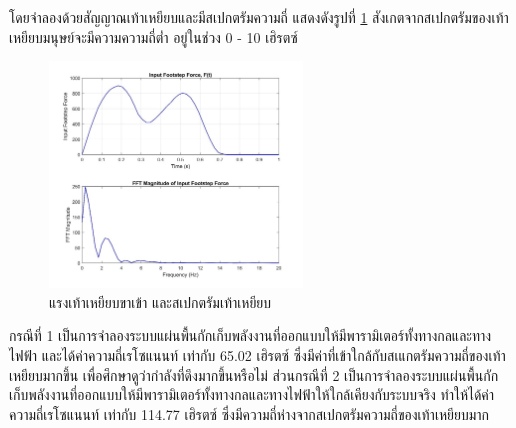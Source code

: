 \documentclass[11pt,a4paper]{article}
\begin{document}
โดยจำลองด้วยสัญญาณเท้าเหยียบและมีสเปกตรัมความถี่ แสดงดังรูปที่ \ref{spectrum_foot_step} สังเกตจากสเปกตรัมของเท้าเหยียบมนุษย์จะมีความความถี่ต่ำ อยู่ในช่วง 0 - 10 เฮิรตซ์ 
\begin{figure}[H]
    \begin{center}
        \includegraphics[width=0.6\textwidth]{spectrum_foot_step.jpg}
    \end{center}
    \caption{แรงเท้าเหยียบขาเข้า และสเปกตรัมเท้าเหยียบ}
    \label{spectrum_foot_step}
\end{figure}

กรณีที่ 1 เป็นการจำลองระบบแผ่นพื้นกักเก็บพลังงานที่ออกแบบให้มีพารามิเตอร์ทั้งทางกลและทางไฟฟ้า และได้ค่าความถี่เรโซแนนท์ เท่ากับ 65.02 เฮิรตซ์ ซึ่งมีค่าที่เข้าใกล้กับสเแกตรัมความถี่ของเท้าเหยียบมากขึ้น เพื่อศึกษาดูว่ากำลังที่ดึงมากขึ้นหรือไม่
ส่วนกรณีที่ 2 เป็นการจำลองระบบแผ่นพื้นกักเก็บพลังงานที่ออกแบบให้มีพารามิเตอร์ทั้งทางกลและทางไฟฟ้าให้ใกล้เคียงกับระบบจริง ทำให้ได้ค่าความถี่เรโซแนนท์ เท่ากับ 114.77 เฮิรตซ์ ซึ่งมีความถี่ห่างจากสเปกตรัมความถี่ของเท้าเหยียบมาก
\end{document}
